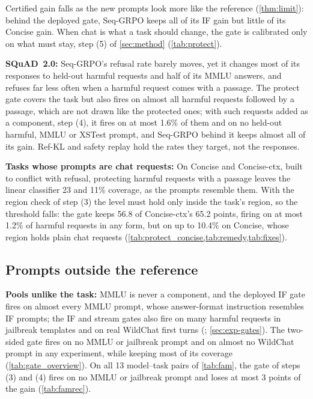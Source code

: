 \documentclass{article}
\theoremstyle{plain}
\theoremstyle{definition}
\theoremstyle{remark}
\begin{document}
Certified gain falls as the new prompts look more like the reference (\cref{thm:limit}): behind the deployed gate,
Seq-GRPO keeps all of its IF gain but little of its Concise gain. When chat is what a task should change, the gate is
calibrated only on what must stay, step (5) of \cref{sec:method} (\cref{tab:protect}).


\textbf{SQuAD~2.0:} Seq-GRPO's refusal rate barely moves, yet it changes most of its responses to held-out harmful
requests and half of its MMLU answers, and refuses far less often when a harmful request comes with a passage. The
protect gate covers the task but also fires on almost all harmful requests followed by a passage, which are not drawn
like the protected ones; with such requests added as a component, step (4), it fires on at most 1.6\% of them and on
no held-out harmful, MMLU or XSTest prompt, and Seq-GRPO behind it keeps almost all of its gain. Ref-KL and safety replay hold the rates they target, not the responses.

\textbf{Tasks whose prompts are chat requests:} On Concise and Concise-ctx, built to conflict with refusal, protecting
harmful requests with a passage leaves the linear classifier 23 and 11\% coverage, as the prompts resemble them. With
the region check of step (3) the level must hold only inside the task's region, so the threshold falls: the gate keeps
56.8 of Concise-ctx's 65.2 points, firing on at most 1.2\% of harmful requests in any form, but on up to 10.4\% on
Concise, whose region holds plain chat requests (\cref{tab:protect_concise,tab:remedy,tab:fixes}).

\subsection{Prompts outside the reference}
\label{sec:res-gates}

\textbf{Pools unlike the task:} MMLU is never a component, and the deployed IF gate fires on almost every MMLU
prompt, whose answer-format instruction resembles IF prompts; the IF and stream gates also fire on many harmful
requests in jailbreak templates and on real WildChat first turns (\citealp{zhao2024wildchat}; \cref{sec:exp-gates}). The two-sided gate fires on
no MMLU or jailbreak prompt and on almost no WildChat prompt in any experiment, while keeping most of its coverage
(\cref{tab:gate_overview}). On all 13 model--task pairs of \cref{tab:fam}, the gate of steps (3) and (4)
fires on no MMLU or jailbreak prompt and loses at most 3 points of the gain (\cref{tab:famrec}).
\end{document}
